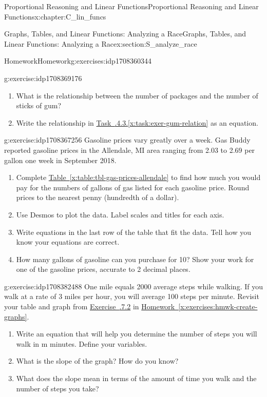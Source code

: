 \documentclass[oneside,10pt,]{book}
\newcommand{\xreffont}{\relax}
\numberwithin{equation}{chapter}
\begin{document}
\begin{chapterptx}{Proportional Reasoning and Linear Functions}{}{Proportional Reasoning and Linear Functions}{}{}{x:chapter:C_lin_funcs}
\begin{sectionptx}{Graphs, Tables, and Linear Functions: Analyzing a Race}{}{Graphs, Tables, and Linear Functions: Analyzing a Race}{}{}{x:section:S_analyze_race}
\begin{exercises-subsection}{Homework}{}{Homework}{}{}{g:exercises:idp1708360344}
\begin{divisionexercise}{3}{}{}{g:exercise:idp1708369176}
\begin{enumerate}[font=\bfseries,label=(\alph*),ref=\alph*]
\item\label{x:task:exer-gum-relation}What is the relationship between the number of packages and the number of sticks of gum?%
\item{}Write the relationship in \hyperref[x:task:exer-gum-relation]{Task~{\xreffont 2.4.4.3}.{\xreffont\ref{x:task:exer-gum-relation}}} as an equation.%
\end{enumerate}
\end{divisionexercise}%
\begin{divisionexercise}{4}{}{}{g:exercise:idp1708367256}%
Gasoline prices vary greatly over a week. Gas Buddy reported gasoline prices in the Allendale, MI area ranging from \textdollar{}2.03 to \textdollar{}2.69 per gallon one week in September 2018.%
\begin{enumerate}[font=\bfseries,label=(\alph*),ref=\alph*]
\item{}Complete \hyperref[x:table:tbl-gas-prices-allendale]{Table~{\xreffont\ref{x:table:tbl-gas-prices-allendale}}} to find how much you would pay for the numbers of gallons of gas listed for each gasoline price. Round prices to the nearest penny (hundredth of a dollar).%
\item{}Use Desmos to plot the data. Label scales and titles for each axis.%
\item{}Write equations in the last row of the table that fit the data. Tell how you know your equations are correct.%
\item{}How many gallons of gasoline can you purchase for \textdollar{}10?  Show your work for one of the gasoline prices, accurate to 2 decimal places.%
\end{enumerate}
\end{divisionexercise}%
\begin{divisionexercise}{5}{}{}{g:exercise:idp1708382488}%
One mile equals 2000 average steps while walking. If you walk at a rate of 3 miles per hour, you will average 100 steps per minute. \footnotemark{} Revisit your table and graph from \hyperlink{x:exercise:exer-walking-22}{Exercise~{\xreffont 2.2.7.2}} in \hyperref[x:exercises:hmwk-create-graphs]{Homework~{\xreffont\ref{x:exercises:hmwk-create-graphs}}}.%
\begin{enumerate}[font=\bfseries,label=(\alph*),ref=\alph*]
\item{}Write an equation that will help you determine the number of steps you will walk in m minutes. Define your variables.%
\item{}What is the slope of the graph? How do you know?%
\item{}What does the slope mean in terms of the amount of time you walk and the number of steps you take?%

\end{enumerate}
\end{divisionexercise}
\end{exercises-subsection}
\end{sectionptx}
\end{chapterptx}
\end{document}
